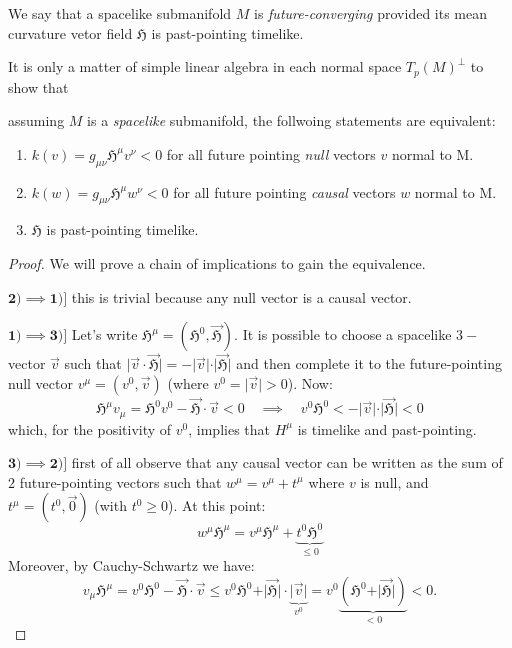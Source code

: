 
\begin{definition}
	We say that a spacelike submanifold \(M\) is \emph{future-converging} provided its mean curvature vetor field \(\mathfrak{H}\) is past-pointing timelike.
\end{definition}



It is only a matter of simple linear algebra in each normal space \(T_p(M)^{\perp}\) to show that
\begin{lemma} \label{lemma:charact-trapped}
	assuming \(M\) is a \emph{spacelike} submanifold, the follwoing statements are equivalent:
	\begin{enumerate}
		\item  \(k(v) =g_{\mu\nu}\mathfrak{H}^{\mu} v^{\nu} < 0 \) for all future pointing \emph{null} vectors \(v\) normal to M.
		\item  \(k(w) =g_{\mu\nu}\mathfrak{H}^{\mu} w^{\nu} < 0 \) for all future pointing \emph{causal} vectors \(w\) normal to M.
		\item \(\mathfrak{H}\) is past-pointing timelike.
	\end{enumerate}
\end{lemma}

\begin{proof}
	We will prove a chain of implications to gain the equivalence.
	
	\(\mathbf{2) \implies 1)]}\) this is trivial because any null vector is a causal vector.
	
	\(\mathbf{1) \implies 3)]}\) Let's write \(\mathfrak{H}^{\mu} = (\mathfrak{H}^0, \vec{\mathfrak{H}})\). It is possible to choose a spacelike \(3-\)vector \(\vec{v}\) such that \(\vert\vec{v}\cdot\vec{\mathfrak{H}}\vert = - \vert\vec{v}\vert\cdot\vert\vec{\mathfrak{H}}\vert\) and  then complete it to the future-pointing null vector \(v^{\mu} = (v^0, \vec{v})\) (where \(v^0 = \vert \vec{v}\vert > 0\)).
	Now:
	\[
	\mathfrak{H}^{\mu}v_{\mu} = \mathfrak{H}^0v^0 - \vec{\mathfrak{H}}\cdot\vec{v} < 0 \quad \implies 
	\quad v^0 \mathfrak{H}^0 < - \vert\vec{v}\vert\cdot\vert\vec{\mathfrak{H}}\vert < 0
	\]
	which, for the positivity of \(v^0\), implies that \(H^{\mu}\) is timelike and past-pointing.
	
	\(\mathbf{3) \implies 2)]}\) first of all observe that any causal vector can be written as the sum of \(2\) future-pointing vectors such that \(w^{\mu}= v^{\mu} + t^{\mu}\) where \(v\) is null, and \(t^{\mu} = (t^0, \vec{0})\) (with \(t^0 \ge 0\)). At this point:
	\[
	w^{\mu}\mathfrak{H}^{\mu} = v^{\mu}\mathfrak{H}^{\mu} + \underbrace{t^0 \mathfrak{H}^0}_{\le0}
	\]
	Moreover, by Cauchy-Schwartz we have:
	\[
	v_{\mu}\mathfrak{H}^{\mu} = v^0 \mathfrak{H}^0 - \vec{\mathfrak{H}}\cdot\vec{v} \le v^0\mathfrak{H}^0 +\vert \vec{\mathfrak{H}}\vert\cdot\underbrace{\vert\vec{v}\vert}_{v^0} = v^0\underbrace{(\mathfrak{H}^0 + \vert \vec{\mathfrak{H}}\vert)}_{<0} < 0.
	\]
\end{proof}


